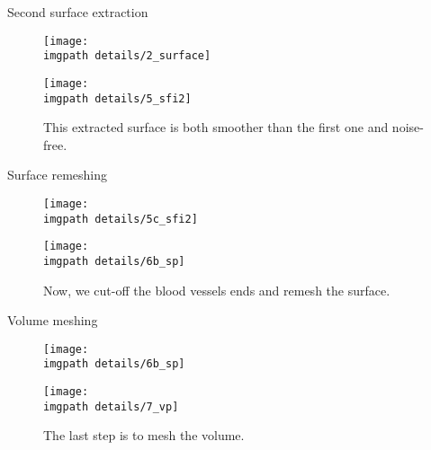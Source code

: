 \begin{frame}{Second surface extraction}
 \begin{center}
 \begin{figure}[H]
 	\begin{minipage}[b]{0.45\linewidth}
            	\centering
            	\texttt{[image: \\imgpath details/2\_surface]}
	\end{minipage}
	\begin{minipage}[b]{0.45\linewidth}
            	\centering
            	\texttt{[image: \\imgpath details/5\_sfi2]}
	\end{minipage}
  	\caption*{This extracted surface is both smoother than the first one and noise-free. }
 \end{figure}
 \end{center}
\end{frame}


\begin{frame}{Surface remeshing}
 \begin{center}
 \begin{figure}[H]
 	\begin{minipage}[b]{0.45\linewidth}
            	\centering
            	\texttt{[image: \\imgpath details/5c\_sfi2]}
	\end{minipage}
	\begin{minipage}[b]{0.45\linewidth}
            	\centering
            	\texttt{[image: \\imgpath details/6b\_sp]}
	\end{minipage}
	\caption*{Now, we cut-off the blood vessels ends and remesh the surface.}
 \end{figure}
 \end{center}
\end{frame}


\begin{frame}{Volume meshing}
 \begin{center}
 \begin{figure}[H]
 	\begin{minipage}[b]{0.45\linewidth}
            	\centering
            	\texttt{[image: \\imgpath details/6b\_sp]}
	\end{minipage}
	\begin{minipage}[b]{0.45\linewidth}
            	\centering
            	\texttt{[image: \\imgpath details/7\_vp]}
	\end{minipage}
	\caption*{The last step is to mesh the volume.}
 \end{figure}
 \end{center}
\end{frame}

